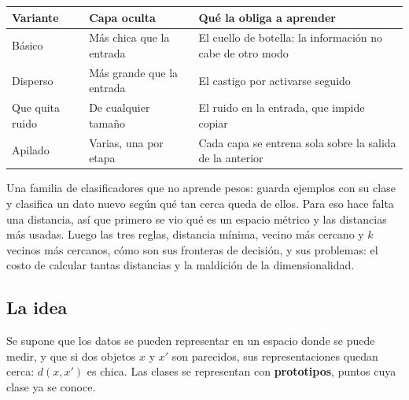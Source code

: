 \documentclass[11pt,letterpaper]{article}
\begin{document}
\begin{center}
\begin{tabular}{>{\raggedright\arraybackslash}p{2.9cm}
                >{\raggedright\arraybackslash}p{3.6cm}
                >{\raggedright\arraybackslash}p{6.7cm}}
  \toprule
  \textbf{Variante} & \textbf{Capa oculta} & \textbf{Qué la obliga a
  aprender} \\
  \midrule
  Básico &
  Más chica que la entrada &
  El cuello de botella: la información no cabe de otro modo \\
  \addlinespace
  Disperso &
  Más grande que la entrada &
  El castigo por activarse seguido \\
  \addlinespace
  Que quita ruido &
  De cualquier tamaño &
  El ruido en la entrada, que impide copiar \\
  \addlinespace
  Apilado &
  Varias, una por etapa &
  Cada capa se entrena sola sobre la salida de la anterior \\
  \bottomrule
\end{tabular}
\end{center}

\newpage



\begin{quick_sum}
    Una familia de clasificadores que no aprende pesos: guarda
    ejemplos con su clase y clasifica un dato nuevo según qué tan cerca
    queda de ellos. Para eso hace falta una distancia, así que primero
    se vio qué es un espacio métrico y las distancias más usadas.
    Luego las tres reglas, distancia mínima, vecino más cercano y $k$
    vecinos más cercanos, cómo son sus fronteras de decisión, y sus
    problemas: el costo de calcular tantas distancias y la maldición
    de la dimensionalidad.
\end{quick_sum}

\subsection*{La idea}

Se supone que los datos se pueden representar en un espacio donde se
puede medir, y que si dos objetos $x$ y $x'$ son parecidos, sus
representaciones quedan cerca: $d(x, x')$ es chica. Las clases se
representan con \textbf{prototipos}, puntos cuya clase ya se conoce.
\end{document}
